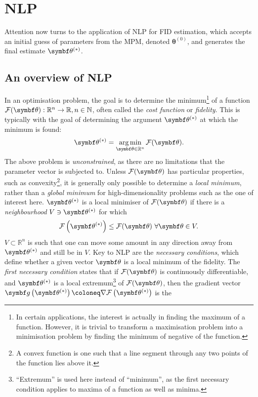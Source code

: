 \section{\Acl{NLP}}
\label{sec:nlp}
Attention now turns to the application of \ac{NLP} for \ac{FID} estimation,
which accepts an initial guess of parameters from the \ac{MPM},
denoted $\symbf{\theta}^{(0)}$, and generates the final estimate $\bthstar$.

\subsection{An overview of \ac{NLP}}
\label{subsec:nlp-overview}
In an optimisation problem, the goal is to determine the minimum\footnote{
    In certain applications, the interest is actually in finding the maximum of
    a function. However, it is trivial to transform a maximisation problem into
    a minimisation problem by finding the minimum of negative of the function.
}
of a function $\Fth: \mathbb{R}^n \rightarrow \mathbb{R}, n \in \mathbb{N}$, often
called the \emph{cost function} or \emph{fidelity}.
This is typically with the goal of determining the argument $\bthstar$ at
which the minimum is found:
\begin{equation}
    \bthstar = \argmin_{\bth \in \mathbb{R}^n} \Fth.
    \label{eq:minF}
\end{equation}
The above problem is \emph{unconstrained}, as there are no limitations that the
parameter vector is subjected to. Unless $\Fth$ has particular properties, such
as convexity\footnote{
    A convex function is one such that a line segment through any two points of
    the function lies above it.
}, it is generally only possible to determine a \emph{local minimum},
rather than a \emph{global minimum} for high-dimensionality problems such as
the one of interest here. $\bthstar$ is a local
minimiser of $\Fth$ if there is a \emph{neighbourhood} $V \ni \bthstar$ for which
\begin{equation}
    \Fthstar \leq \Fth\ \forall \bth \in V.
  \label{def:local-minimiser}
\end{equation}
$V \subset \mathbb{R}^n$ is such that one can move some amount in any direction
away from $\bthstar$ and still be in $V$.
Key to \ac{NLP} are the \emph{necessary conditions}, which define whether a
given vector $\bth$ is a local minimum of the fidelity.
The \emph{first necessary condition} states
that if $\Fth$ is continuously differentiable, and $\bthstar$ is a local extremum\footnote{
    ``Extremum'' is used here instead of ``minimum'', as the first necessary
    condition applies to maxima of a function as well as minima.
} of $\Fth$, then the gradient vector $\bdgthstar \coloneq \nabla \Fthstar$ is the
